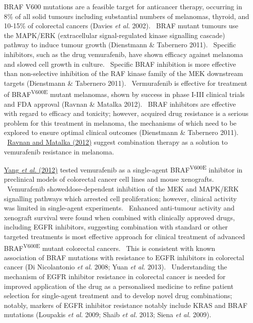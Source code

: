 BRAF V600 mutations are a feasible target for anticancer therapy, occurring in 8\% of all solid tumours including substantial numbers of melanomas, thyroid, and 10-15\% of colorectal cancers (Davies\textit{ et al.} 2002). \ BRAF mutant tumours use the MAPK/ERK (extracellular signal-regulated kinase signalling cascade) pathway to induce tumour growth (Dienstmann \& Tabernero 2011). \ Specific inhibitors, such as the drug vemurafenib, have shown efficacy against melanoma and slowed cell growth in culture. \ Specific BRAF inhibition is more effective than non-selective inhibition of the RAF kinase family of the MEK downstream targets (Dienstmann \& Tabernero 2011). \ Vermurafenib is effective for treatment of BRAF\textsuperscript{V600E} mutant melanomas, shown by success in phase I-III clinical trials and FDA approval (Ravnan \& Matalka 2012). \ BRAF inhibitors are effective with regard to efficacy and toxicity; however, acquired drug resistance is a serious problem for this treatment in melanoma, the mechanisms of which need to be explored to ensure optimal clinical outcomes (Dienstmann \& Tabernero 2011). \ \hyperlink{ENREF82}{Ravnan and Matalka (2012)} suggest combination therapy as a solution to vemurafenib resistance in melanoma. \  

\hyperlink{ENREF115}{Yang}\hyperlink{ENREF115}{\textit{ et al.}}\hyperlink{ENREF115}{ (2012)} tested vemurafenib as a single-agent BRAF\textsuperscript{V600E} inhibitor in preclinical models of colorectal cancer cell lines and mouse xenografts. \ Vemurafenib showeddose-dependent inhibition of the MEK and MAPK/ERK signalling pathways which arrested cell proliferation; however, clinical activity was limited in single-agent experiments. \ Enhanced anti-tumour activity and xenograft survival were found when combined with clinically approved drugs, including EGFR inhibitors, suggesting combination with standard or other targeted treatments is most effective approach for clinical treatment of advanced BRAF\textsuperscript{V600E} mutant colorectal cancers. \ This is consistent with known association of BRAF mutations with resistance to EGFR inhibitors in colorectal cancer (Di Nicolantonio\textit{ et al.} 2008; Yuan\textit{ et al.} 2013). \ Understanding the mechanism of EGFR inhibitor resistance in colorectal cancer is needed for improved application of the drug as a personalised medicine to refine patient selection for single-agent treatment and to develop novel drug combinations; notably, markers of EGFR inhibitor resistance notably include KRAS and BRAF mutations (Loupakis\textit{ et al.} 2009; Shaib\textit{ et al.} 2013; Siena\textit{ et al.} 2009). \  

